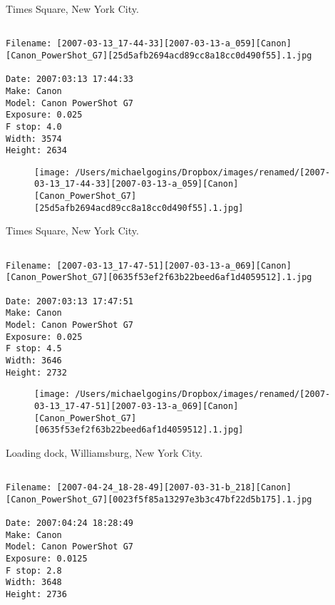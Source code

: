 \documentclass[11pt,letter,DIV=14,paper=landscape]{scrbook}
\begin{document}
\clearpage
\noindent Times Square, New York City.
\noindent
\begin{lstlisting}

Filename: [2007-03-13_17-44-33][2007-03-13-a_059][Canon][Canon_PowerShot_G7][25d5afb2694acd89cc8a18cc0d490f55].1.jpg

Date: 2007:03:13 17:44:33
Make: Canon
Model: Canon PowerShot G7
Exposure: 0.025
F stop: 4.0
Width: 3574
Height: 2634
\end{lstlisting}
\clearpage

\begin{figure}
\texttt{[image: /Users/michaelgogins/Dropbox/images/renamed/[2007-03-13\_17-44-33][2007-03-13-a\_059][Canon][Canon\_PowerShot\_G7][25d5afb2694acd89cc8a18cc0d490f55].1.jpg]}
\end{figure}
    
\clearpage
\noindent Times Square, New York City.
\noindent
\begin{lstlisting}

Filename: [2007-03-13_17-47-51][2007-03-13-a_069][Canon][Canon_PowerShot_G7][0635f53ef2f63b22beed6af1d4059512].1.jpg

Date: 2007:03:13 17:47:51
Make: Canon
Model: Canon PowerShot G7
Exposure: 0.025
F stop: 4.5
Width: 3646
Height: 2732
\end{lstlisting}
\clearpage

\begin{figure}
\texttt{[image: /Users/michaelgogins/Dropbox/images/renamed/[2007-03-13\_17-47-51][2007-03-13-a\_069][Canon][Canon\_PowerShot\_G7][0635f53ef2f63b22beed6af1d4059512].1.jpg]}
\end{figure}
    
\clearpage
\noindent Loading dock, Williamsburg, New York City.
\noindent
\begin{lstlisting}

Filename: [2007-04-24_18-28-49][2007-03-31-b_218][Canon][Canon_PowerShot_G7][0023f5f85a13297e3b3c47bf22d5b175].1.jpg

Date: 2007:04:24 18:28:49
Make: Canon
Model: Canon PowerShot G7
Exposure: 0.0125
F stop: 2.8
Width: 3648
Height: 2736
\end{lstlisting}
\clearpage
\end{document}
